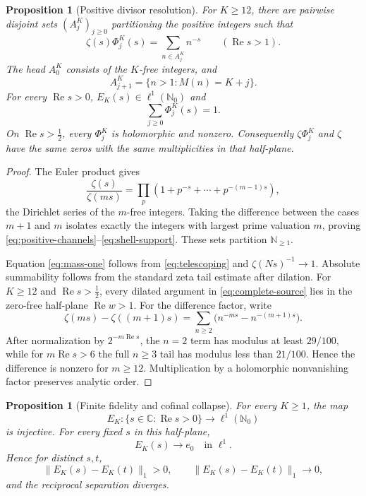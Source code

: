 \documentclass[11pt]{article}
\newtheorem{proposition}[theorem]{Proposition}
\theoremstyle{definition}
\theoremstyle{remark}
\newcommand{\C}{\mathbb C}
\newcommand{\N}{\mathbb N}
\newcommand{\Rea}{\operatorname{Re}}
\begin{document}
\begin{proposition}[Positive divisor resolution]\label{prop:positive-source}
For \(K\geq12\), there are pairwise disjoint sets
\((A^K_j)_{j\geq0}\) partitioning the positive integers such that
\[
                  \zeta(s)\Phi^K_j(s)
                  =\sum_{n\in A^K_j}n^{-s}
                  \qquad(\Rea s>1).
\tag{3.4}\label{eq:positive-channels}
\]
The head \(A^K_0\) consists of the \(K\)-free integers, and
\[
                  A^K_{j+1}=\{n>1:M(n)=K+j\}.
\tag{3.5}\label{eq:shell-support}
\]
For every \(\Rea s>0\), \(E_K(s)\in\ell^1(\N_0)\) and
\[
                              \sum_{j\geq0}\Phi^K_j(s)=1.
\tag{3.6}\label{eq:mass-one}
\]
On \(\Rea s>\tfrac12\), every \(\Phi^K_j\) is holomorphic and nonzero.
Consequently \(\zeta\Phi^K_j\) and \(\zeta\) have the same zeros with the
same multiplicities in that half-plane.
\end{proposition}

\begin{proof}
The Euler product gives
\[
 \frac{\zeta(s)}{\zeta(ms)}
 =\prod_p(1+p^{-s}+\cdots+p^{-(m-1)s}),
\]
the Dirichlet series of the \(m\)-free integers.  Taking the difference
between the cases \(m+1\) and \(m\) isolates exactly the integers with
largest prime valuation \(m\), proving
\eqref{eq:positive-channels}--\eqref{eq:shell-support}.  These sets partition
\(\N_{\geq1}\).

Equation \eqref{eq:mass-one} follows from \eqref{eq:telescoping} and
\(\zeta(Ns)^{-1}\to1\).  Absolute summability follows from the standard
zeta tail estimate after dilation.  For \(K\geq12\) and
\(\Rea s>\tfrac12\), every dilated argument in \eqref{eq:complete-source}
lies in the zero-free half-plane \(\Rea w>1\).  For the difference factor,
write
\[
 \zeta(ms)-\zeta((m+1)s)
   =\sum_{n\ge2}\bigl(n^{-ms}-n^{-(m+1)s}\bigr).
\]
After normalization by \(2^{-m\Rea s}\), the \(n=2\) term has modulus at
least \(29/100\), while for \(m\Rea s>6\) the full \(n\ge3\) tail has
modulus less than \(21/100\).  Hence the difference is nonzero for
\(m\ge12\).  Multiplication by a holomorphic nonvanishing factor preserves
analytic order.
\end{proof}

\begin{proposition}[Finite fidelity and cofinal collapse]\label{prop:collapse}
For every \(K\geq1\), the map
\[
           E_K:\{s\in\C:\Rea s>0\}\longrightarrow\ell^1(\N_0)
\tag{3.7}\label{eq:embedding}
\]
is injective.  For every fixed \(s\) in this half-plane,
\[
                              E_K(s)\longrightarrow e_0
                              \quad\text{in }\ell^1.
\tag{3.8}\label{eq:collapse}
\]
Hence for distinct \(s,t\),
\[
       \|E_K(s)-E_K(t)\|_1>0,\qquad
       \|E_K(s)-E_K(t)\|_1\longrightarrow0,
\tag{3.9}\label{eq:conditioning}
\]
and the reciprocal separation diverges.
\end{proposition}
\end{document}
